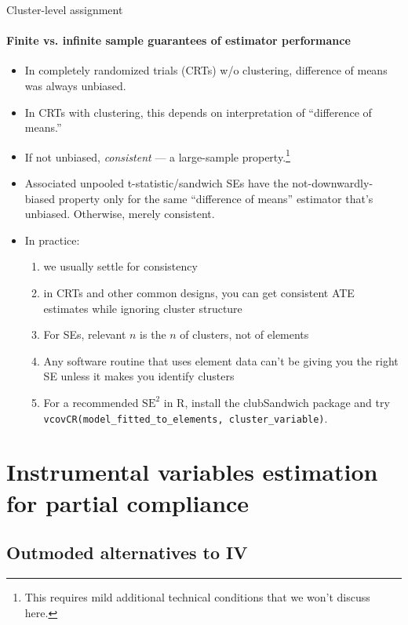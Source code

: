 \begin{frame}[shrink]{Cluster-level assignment}
\framesubtitle{Finite vs. infinite sample guarantees of estimator performance}

\begin{itemize}
\item In completely randomized trials (CRTs) w/o clustering, difference of means was always unbiased.
\item In CRTs with clustering, this depends on interpretation of ``difference of means.''
\item If not unbiased, \textit{consistent} --- a large-sample property.\footnote{This requires mild additional technical conditions that we won't discuss here.}
\item Associated unpooled t-statistic/sandwich SEs have the not-downwardly-biased property only for the same ``difference of means'' estimator that's unbiased.  Otherwise, merely consistent.

\item In practice:
  \begin{enumerate}
  \item we usually settle for consistency
  \item in CRTs and other common designs, you can get consistent ATE estimates while ignoring cluster structure
  \item For SEs, relevant $n$ is the $n$ of clusters, not of elements
  \item Any software routine that uses element data can't be giving
    you the right SE unless it makes you identify clusters
  \item For a recommended $\mathrm{SE}^2$ in R, install the clubSandwich package and try \texttt{vcovCR(model\_fitted\_to\_elements, cluster\_variable)}.
  \end{enumerate}
\end{itemize}
\end{frame}

\section{Instrumental variables estimation for partial compliance}

\subsection{Outmoded alternatives to IV}

